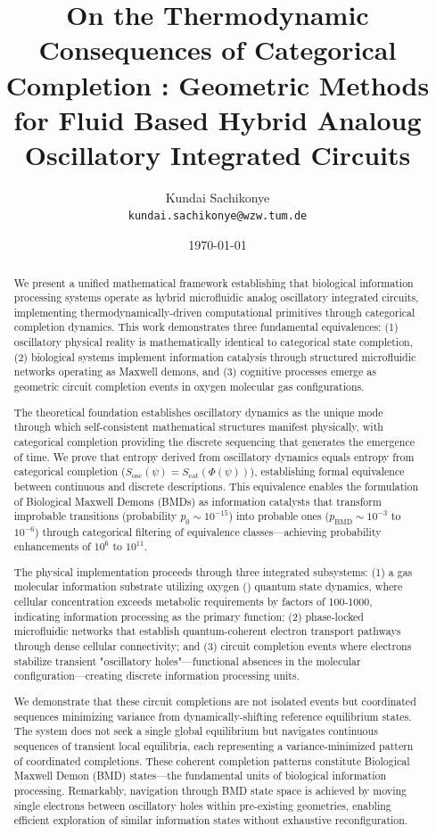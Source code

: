 \documentclass[12pt,a4paper]{article}
\title{On the Thermodynamic Consequences of Categorical Completion : Geometric Methods for  Fluid Based Hybrid Analoug Oscillatory Integrated Circuits }
\author{
Kundai Sachikonye \\
\texttt{kundai.sachikonye@wzw.tum.de}
}
\date{\today}
\begin{document}
\maketitle

\begin{abstract}
We present a unified mathematical framework establishing that biological information processing systems operate as hybrid microfluidic analog oscillatory integrated circuits, implementing thermodynamically-driven computational primitives through categorical completion dynamics. This work demonstrates three fundamental equivalences: (1) oscillatory physical reality is mathematically identical to categorical state completion, (2) biological systems implement information catalysis through structured microfluidic networks operating as Maxwell demons, and (3) cognitive processes emerge as geometric circuit completion events in oxygen molecular gas configurations.

The theoretical foundation establishes oscillatory dynamics as the unique mode through which self-consistent mathematical structures manifest physically, with categorical completion providing the discrete sequencing that generates the emergence of time. We prove that entropy derived from oscillatory dynamics equals entropy from categorical completion ($S_{\text{osc}}(\psi) = S_{\text{cat}}(\Phi(\psi))$), establishing formal equivalence between continuous and discrete descriptions. This equivalence enables the formulation of Biological Maxwell Demons (BMDs) as information catalysts that transform improbable transitions (probability $p_0 \sim 10^{-15}$) into probable ones ($p_{\text{BMD}} \sim 10^{-3}$ to $10^{-6}$) through categorical filtering of equivalence classes—achieving probability enhancements of $10^6$ to $10^{11}$.

The physical implementation proceeds through three integrated subsystems: (1) a gas molecular information substrate utilizing oxygen () quantum state dynamics, where cellular  concentration exceeds metabolic requirements by factors of 100-1000, indicating information processing as the primary function; (2) phase-locked microfluidic networks that establish quantum-coherent electron transport pathways through dense cellular connectivity; and (3) circuit completion events where electrons stabilize transient "oscillatory holes"—functional absences in the  molecular configuration—creating discrete information processing units.

We demonstrate that these circuit completions are not isolated events but coordinated sequences minimizing variance from dynamically-shifting reference equilibrium states. The system does not seek a single global equilibrium but navigates continuous sequences of transient local equilibria, each representing a variance-minimized pattern of coordinated completions. These coherent completion patterns constitute Biological Maxwell Demon (BMD) states—the fundamental units of biological information processing. Remarkably, navigation through BMD state space is achieved by moving single electrons between oscillatory holes within pre-existing  geometries, enabling efficient exploration of similar information states without exhaustive reconfiguration.


\end{abstract}
\end{document}
